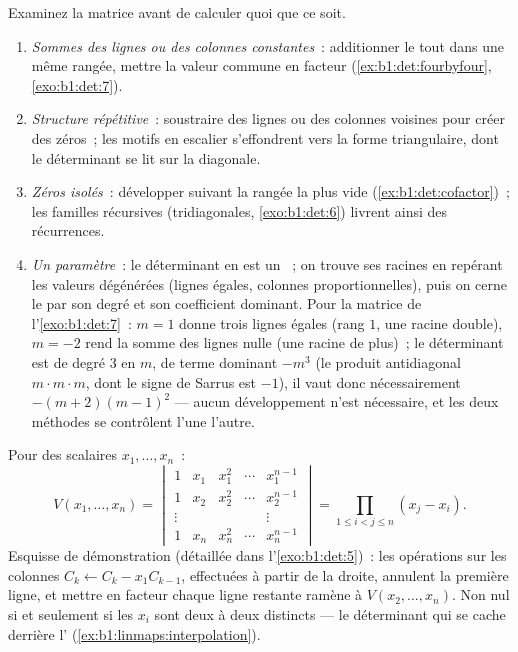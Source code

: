 \begin{method}
\label{met:b1:det:strategy}
Examinez la matrice avant de calculer quoi que ce soit.
\begin{enumerate}
  \item \emph{Sommes des lignes ou des colonnes constantes}~:
        additionner le tout dans une même rangée, mettre la valeur
        commune en facteur
        (\cref{ex:b1:det:fourbyfour}, \cref{exo:b1:det:7}).
  \item \emph{Structure répétitive}~: soustraire des lignes ou des
        colonnes voisines pour créer des zéros~; les motifs en
        escalier s'effondrent vers la forme triangulaire, dont le
        déterminant se lit sur la diagonale.
  \item \emph{Zéros isolés}~: développer suivant la rangée la plus
        vide (\cref{ex:b1:det:cofactor})~; les familles récursives
        (tridiagonales, \cref{exo:b1:det:6}) livrent ainsi des
        récurrences.
  \item \emph{Un paramètre}~: le déterminant en est un ~; on
        trouve ses racines en repérant les valeurs dégénérées
        (lignes égales, colonnes proportionnelles), puis on cerne le
         par son degré et son coefficient dominant. Pour
        la matrice de l'\cref{exo:b1:det:7}~: $m = 1$ donne trois
        lignes égales (rang $1$, une racine double), $m = -2$ rend la
        somme des lignes nulle (une racine de plus)~; le déterminant
        est de degré $3$ en $m$, de terme dominant $-m^3$ (le
        produit antidiagonal $m\cdot m\cdot m$, dont le signe de
        Sarrus est $-1$), il vaut donc nécessairement
        $-(m+2)(m-1)^2$ --- aucun développement n'est nécessaire, et
        les deux méthodes se contrôlent l'une l'autre.
\end{enumerate}
\end{method}

\begin{example}\label{ex:b1:det:vandermonde}
Pour des scalaires $x_1, \dots, x_n$~:
\[
V(x_1, \dots, x_n) =
\begin{vmatrix}
1 & x_1 & x_1^2 & \cdots & x_1^{n-1}\\
1 & x_2 & x_2^2 & \cdots & x_2^{n-1}\\
\vdots & & & & \vdots\\
1 & x_n & x_n^2 & \cdots & x_n^{n-1}
\end{vmatrix}
= \prod_{1 \leq i < j \leq n} (x_j - x_i) .
\]
Esquisse de démonstration (détaillée dans l'\cref{exo:b1:det:5})~: les
opérations sur les colonnes $C_k \leftarrow C_k - x_1 C_{k-1}$,
effectuées à partir de la droite, annulent la première ligne, et
mettre en facteur chaque ligne restante ramène à
$V(x_2, \dots, x_n)$. Non nul si et seulement si les $x_i$ sont deux à
deux distincts --- le déterminant qui se cache derrière
l' (\cref{ex:b1:linmaps:interpolation}).
\end{example}

